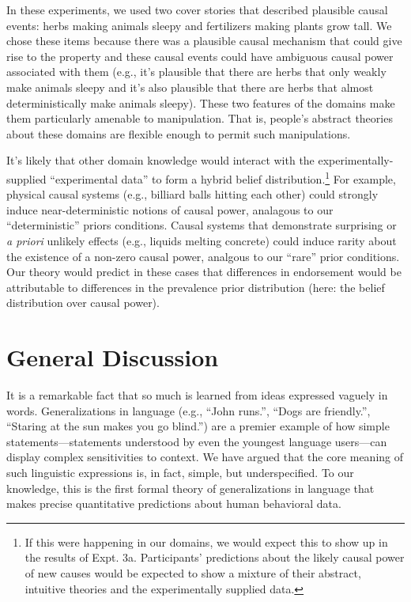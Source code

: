 \documentclass[english,floatsintext,man]{apa6}
\theoremstyle{definition}
\theoremstyle{definition}
\theoremstyle{definition}
\theoremstyle{remark}
\begin{document}
In these experiments, we used two cover stories that described plausible
causal events: herbs making animals sleepy and fertilizers making plants
grow tall. We chose these items because there was a plausible causal
mechanism that could give rise to the property and these causal events
could have ambiguous causal power associated with them (e.g., it's
plausible that there are herbs that only weakly make animals sleepy and
it's also plausible that there are herbs that almost deterministically
make animals sleepy). These two features of the domains make them
particularly amenable to manipulation. That is, people's abstract
theories about these domains are flexible enough to permit such
manipulations.

It's likely that other domain knowledge would interact with the
experimentally-supplied \enquote{experimental data} to form a hybrid
belief distribution.\footnote{If this were happening in our domains, we
  would expect this to show up in the results of Expt. 3a. Participants'
  predictions about the likely causal power of new causes would be
  expected to show a mixture of their abstract, intuitive theories and
  the experimentally supplied data.} For example, physical causal
systems (e.g., billiard balls hitting each other) could strongly induce
near-deterministic notions of causal power, analagous to our
\enquote{deterministic} priors conditions. Causal systems that
demonstrate surprising or \emph{a priori} unlikely effects (e.g.,
liquids melting concrete) could induce rarity about the existence of a
non-zero causal power, analgous to our \enquote{rare} prior conditions.
Our theory would predict in these cases that differences in endorsement
would be attributable to differences in the prevalence prior
distribution (here: the belief distribution over causal power).

\section{General Discussion}\label{general-discussion}

It is a remarkable fact that so much is learned from ideas expressed
vaguely in words. Generalizations in language (e.g., \enquote{John
runs.}, \enquote{Dogs are friendly.}, \enquote{Staring at the sun makes
you go blind.}) are a premier example of how simple
statements---statements understood by even the youngest language
users---can display complex sensitivities to context. We have argued
that the core meaning of such linguistic expressions is, in fact,
simple, but underspecified. To our knowledge, this is the first formal
theory of generalizations in language that makes precise quantitative
predictions about human behavioral data.
\end{document}
